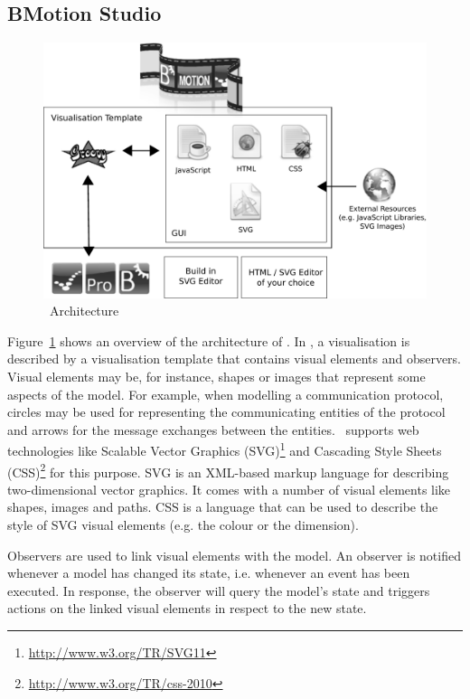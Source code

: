 \documentclass[twoside,10pt]{book}
\begin{document}
\subsection{BMotion Studio}

\begin{figure}[!ht]
\begin{center}
	\includegraphics[width=14cm]{img/tutorial/bms_architecture}
	\caption{\bms~Architecture}
	\label{fig_tut_00_architecture}
\end{center}
\end{figure}

Figure~\ref{fig_tut_00_architecture} shows an overview of the architecture of \bms. 
In \bms, a visualisation is described by a visualisation template that contains visual elements and observers. 
Visual elements may be, for instance, shapes or images that represent some aspects of the model. 
For example, when modelling a communication protocol, circles may be used for representing the communicating entities of the protocol and arrows for the message exchanges between the entities. 
\bms~supports web technologies like Scalable Vector Graphics (SVG)\footnote{\url{http://www.w3.org/TR/SVG11}} and Cascading Style Sheets (CSS)\footnote{\url{http://www.w3.org/TR/css-2010}} for this purpose. 
SVG is an XML-based markup language for describing two-dimensional vector graphics. 
It comes with a number of visual elements like shapes, images and paths.
CSS is a language that can be used to describe the style of SVG visual elements (e.g. the colour or the dimension). 

Observers are used to link visual elements with the model. 
An observer is notified whenever a model has changed its state, i.e. whenever an event has been executed. 
In response, the observer will query the model's state and triggers actions on the linked visual elements in respect to the new state. 
\end{document}
